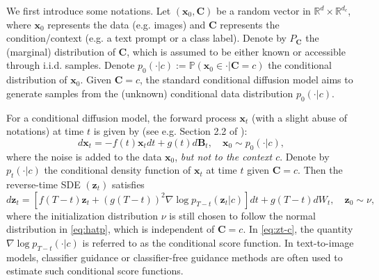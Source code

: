 \documentclass[11pt]{article}
\begin{document}
We first introduce some notations. Let $(\mathbf{x}_{0}, \mathbf{C})$ be a random vector in $\mathbb{R}^d \times \mathbb{R}^{d_c}$, where $\mathbf{x}_{0}$ represents the data (e.g. images) and $\mathbf{C}$ represents the condition/context (e.g. a text prompt or a class label). Denote by $P_{\mathbf{C}}$ the (marginal) distribution of $\mathbf{C}$, which is assumed to be either known or accessible through i.i.d. samples.
Denote $ p_{0}(\cdot|c) := \mathbb{P}(\mathbf{x}_{0} \in \cdot |\mathbf{C} = c )$ the conditional distribution of $\mathbf{x}_{0}$. Given $\mathbf{C} = c$,
the standard conditional diffusion model aims to generate samples from the (unknown) conditional data distribution $p_{0}(\cdot|c)$.

For a conditional diffusion model,
the forward process $\mathbf{x}_{t}$ (with a slight abuse of notations) at time $t$ is given by (see e.g. Section 2.2 of \citealp{chen2024overview}):
\begin{equation}\label{OU:SDE-condition}
d\mathbf{x}_{t}=-f(t)\mathbf{x}_{t}dt+g(t)d\mathbf{B}_{t},  \quad \mathbf{x}_{0} \sim p_{0}(\cdot|c),
\end{equation}
where the noise is added to the data $\mathbf{x}_{0}$, {\it but not to the context $c$}.
Denote by $p_{t}(\cdot|c)$ the conditional density function of $\mathbf{x}_t$ at time $t$ given $\mathbf{C} = c$.
Then the reverse-time SDE $(\mathbf{z}_{t})$ satisfies
\begin{equation}\label{eq:zt-c}
d\mathbf{z}_{t}=\left[f(T-t)\mathbf{z}_{t}+(g(T-t))^{2}\nabla\log p_{T-t}(\mathbf{z}_{t} |c)\right]dt
+g(T-t)d W_{t}, \quad \mathbf{z}_{0}\sim\nu,
\end{equation}
where the initialization distribution $\nu$ is still chosen to follow the normal distribution in \eqref{eq:hatp}, which is independent of $\mathbf{C} = c$. In \eqref{eq:zt-c}, the quantity $\nabla\log p_{T-t}(\cdot |c)$ is referred to as the conditional score function. In text-to-image models, classifier guidance \citep{dhariwal2021diffusion} or classifier-free guidance methods \citep{ho2022classifier} are often used to estimate such conditional score functions.
\end{document}
